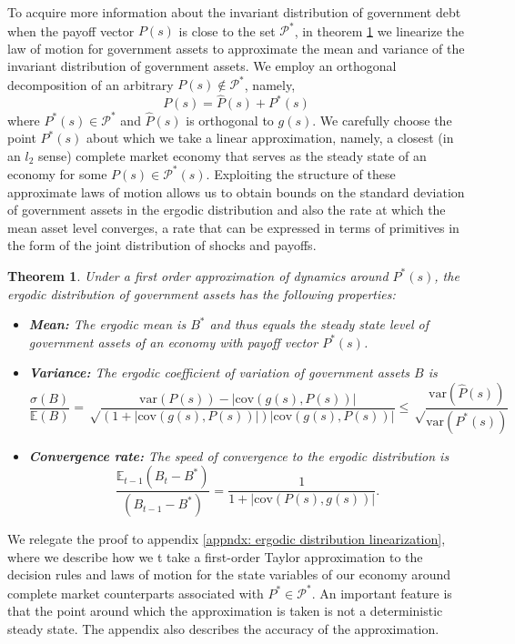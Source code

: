 \documentclass[thmsb,11pt]{article}
\newtheorem{theorem}{Theorem}
\newcommand{\EE}{\mathbb E}
\newcommand{\var}{\mathrm{var}}
\newcommand{\cov}{\mathrm{cov}}
\begin{document}
To acquire more information about the invariant distribution of government debt when the payoff vector $P(s)$ is close to  the set $\mathcal{P}^*$, in  theorem \ref{thm: rep agent linear policies} we linearize the law of motion for  government assets to approximate %
  the mean and variance of the invariant distribution of government assets.
We employ an  orthogonal decomposition of an arbitrary $P(s) \not \in \mathcal{P}^*$, namely,
\[P(s)=\hat{P}(s)+P^*(s)\] where $P^*(s)\in \mathcal{P}^*$ and $\hat{P}(s)$ is orthogonal to $g(s)$. We carefully  choose the point
$P^*(s)$ about which we take a linear  approximation, namely,
a closest (in an $l_2$ sense) complete market economy that  serves as the steady state of an economy for  some $P(s)\in\mathcal{P}^*(s)$.
Exploiting the structure of these approximate laws of motion allows us to obtain bounds on the standard deviation of government  assets in the
ergodic distribution and also the rate at which the mean asset level converges, a rate  that can be expressed in terms of primitives in the form
of the joint distribution of shocks and payoffs.

\begin{theorem}
\label{thm: rep agent linear policies}
Under a  first order approximation of dynamics around $P^*(s)$, the ergodic distribution of government assets has the following properties:
\begin{itemize}
 \item \textbf{Mean:} The ergodic mean is $B^*$ and thus equals the steady state level of government assets  of an economy with payoff vector $P^*(s)$.
 \item \textbf{Variance:} The ergodic coefficient of variation of government assets $B$ is
  \[
    \frac{\sigma(B)}{\mathbb E(B)} = \sqrt\frac{\var(P(s)) - |\cov(g(s),P(s))|}{(1+|\cov(g(s),P(s))|)|\cov(g(s),P(s))|}\leq\sqrt\frac{\var(\hat{P}(s))}{\var(P^*(s))}
  \]
  \item \textbf{Convergence rate:} The speed of convergence to the ergodic distribution is
  \[
    \frac{\EE_{t-1}(B_t-B^*)}{(B_{t-1} - B^*)} = \frac1{1+|\cov(P(s),g(s))|}.
  \]

\end{itemize}


\end{theorem}
 We relegate the proof to appendix  \ref{appndx: ergodic distribution linearization}, where we describe how %
we t take a first-order Taylor approximation to the decision rules and laws of motion for the state variables of our
economy around complete market counterparts associated with $P^*\in \mathcal{P}^*$.
An important feature is that the point around which the  approximation is taken is not a deterministic steady state.
The appendix also describes the accuracy of the approximation.
\end{document}
